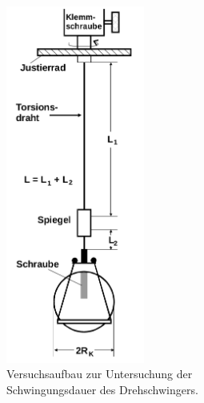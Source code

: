 \begin{figure}
	\centering
	\begin{subfigure}[b]{0.48\textwidth}
		\centering

		\includegraphics[width=0.5\textwidth]{Bilder/aufbauallgemein.png}
		\caption{Versuchsaufbau zur Untersuchung der Schwingungsdauer des Drehschwingers. \cite{Anleitung}}
		\label{fig:pendel}
	\end{subfigure}
	\begin{subfigure}[b]{0.48\textwidth}
		\centering


\end{subfigure}
\end{figure}

